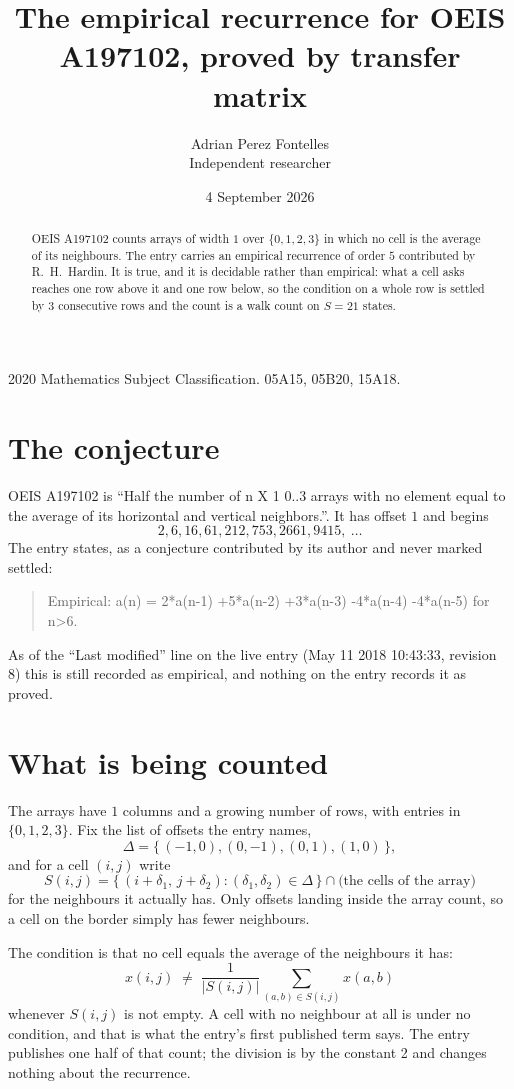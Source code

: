 \documentclass[11pt,a4paper]{article}
\title{The empirical recurrence for OEIS A197102, proved by transfer matrix}
\author{Adrian Perez Fontelles\\ \small Independent researcher}
\date{4 September 2026}
\theoremstyle{plain}
\theoremstyle{definition}
\begin{document}
\maketitle

\begin{abstract}
OEIS A197102 counts arrays of width $1$ over $\{0,1,2,3\}$ in which no cell is the average of its neighbours. The entry carries an
empirical recurrence of order $5$ contributed by R.~H.~Hardin. It is true, and it is
decidable rather than empirical: what a cell asks reaches one row above
it and one row below, so the condition on a whole row is settled by
$3$ consecutive rows and the count is a walk count on $S=21$ states.
\end{abstract}

\noindent\small 2020 Mathematics Subject Classification. 05A15, 05B20, 15A18.\normalsize

\section{The conjecture}

OEIS A197102 is ``Half the number of n X 1 0..3 arrays with no element equal to the average of its horizontal and vertical neighbors.''. It has offset $1$ and begins
\[
2, 6, 16, 61, 212, 753, 2661, 9415,\ \dots
\]
The entry states, as a conjecture contributed by its author and never marked settled:
\begin{quote}
Empirical: a(n) = 2*a(n-1) +5*a(n-2) +3*a(n-3) -4*a(n-4) -4*a(n-5) for n>6.
\end{quote}
As of the ``Last modified'' line on the live entry (May 11 2018 10:43:33, revision 8) this is still
recorded as empirical, and nothing on the entry records it as proved.

\section{What is being counted}

The arrays have $1$ columns and a growing number of rows, with entries in $\{0,1,2,3\}$. Fix the
list of offsets the entry names,
\[
\Delta=\{\,(-1,0), (0,-1), (0,1), (1,0)\,\},
\]
and for a cell $(i,j)$ write
\[
S(i,j)=\{\,(i+\delta_1,\,j+\delta_2) : (\delta_1,\delta_2)\in\Delta\,\}\cap
\text{(the cells of the array)}
\]
for the neighbours it actually has. Only offsets landing inside the array count, so a cell on
the border simply has fewer neighbours.

The condition is that no cell equals the average of the neighbours it has:
\[
x(i,j)\;\neq\;\frac{1}{|S(i,j)|}\sum_{(a,b)\in S(i,j)}x(a,b)
\]
whenever $S(i,j)$ is not empty. A cell with no neighbour at all is under no condition, and that is what the entry's first published term says. The entry publishes one half of that count; the division is by the constant 2 and changes nothing about the recurrence.
\end{document}
